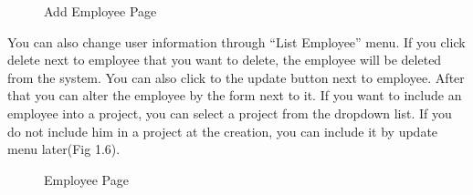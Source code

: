\documentclass[a4paper,10pt,english]{sphinxmanual}
\begin{document}
\begin{figure}[htbp]
\centering
\capstart

\noindent{}
\caption{Add Employee Page}\label{\detokenize{user/member1:id5}}\end{figure}

You can also change user information through “List Employee” menu. If you click delete next to employee that you want to delete,
the employee will be deleted from the system. You can also click to the update button next to employee. After that you can alter
the employee by the form next to it. If you want to include an employee into a project, you can select a project from the dropdown list.
If you do not include him in a project at the creation, you can include it by update menu later(Fig 1.6).

\begin{figure}[htbp]
\centering
\capstart

\noindent{}
\caption{Employee Page}\label{\detokenize{user/member1:id6}}\end{figure}

\begin{DUlineblock}{0em}
\item[] 
\end{DUlineblock}

\begin{DUlineblock}{0em}
\item[] 
\end{DUlineblock}

\begin{DUlineblock}{0em}
\item[] 
\end{DUlineblock}

\begin{DUlineblock}{0em}
\item[] 
\end{DUlineblock}

\begin{DUlineblock}{0em}
\item[] 
\end{DUlineblock}

\begin{DUlineblock}{0em}
\item[] 
\end{DUlineblock}

\begin{DUlineblock}{0em}
\item[] 
\end{DUlineblock}
\end{document}
